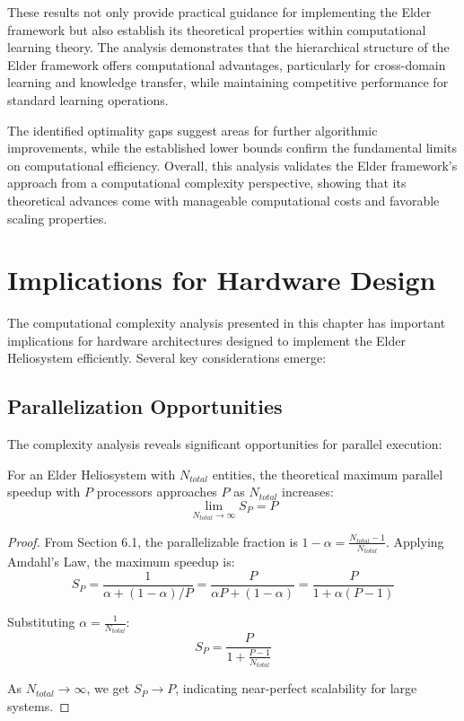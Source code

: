These results not only provide practical guidance for implementing the Elder framework but also establish its theoretical properties within computational learning theory. The analysis demonstrates that the hierarchical structure of the Elder framework offers computational advantages, particularly for cross-domain learning and knowledge transfer, while maintaining competitive performance for standard learning operations.

The identified optimality gaps suggest areas for further algorithmic improvements, while the established lower bounds confirm the fundamental limits on computational efficiency. Overall, this analysis validates the Elder framework's approach from a computational complexity perspective, showing that its theoretical advances come with manageable computational costs and favorable scaling properties.

\section{Implications for Hardware Design}

The computational complexity analysis presented in this chapter has important implications for hardware architectures designed to implement the Elder Heliosystem efficiently. Several key considerations emerge:

\subsection{Parallelization Opportunities}

The complexity analysis reveals significant opportunities for parallel execution:

\begin{theorem}
For an Elder Heliosystem with $N_{total}$ entities, the theoretical maximum parallel speedup with $P$ processors approaches $P$ as $N_{total}$ increases:
\begin{equation}
\lim_{N_{total} \to \infty} S_P = P
\end{equation}
\end{theorem}

\begin{proof}
From Section 6.1, the parallelizable fraction is $1 - \alpha = \frac{N_{total} - 1}{N_{total}}$. Applying Amdahl's Law, the maximum speedup is:
\begin{equation}
S_P = \frac{1}{\alpha + (1-\alpha)/P} = \frac{P}{\alpha P + (1-\alpha)} = \frac{P}{1 + \alpha(P-1)}
\end{equation}

Substituting $\alpha = \frac{1}{N_{total}}$:
\begin{equation}
S_P = \frac{P}{1 + \frac{P-1}{N_{total}}}
\end{equation}

As $N_{total} \to \infty$, we get $S_P \to P$, indicating near-perfect scalability for large systems.
\end{proof}

